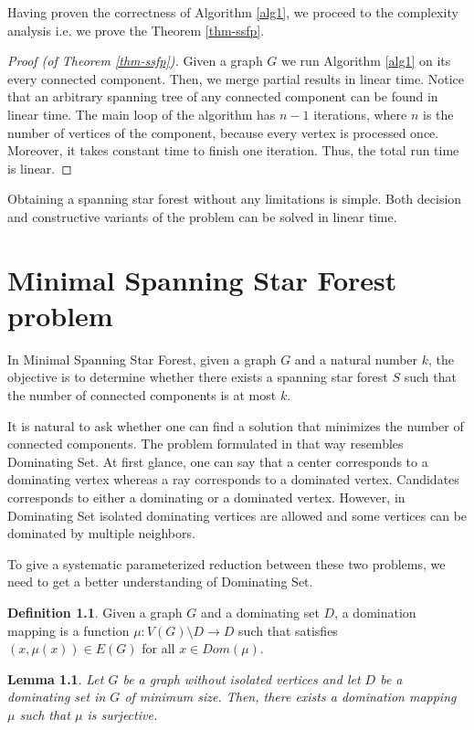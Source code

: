 \documentclass[en]{pracamgr}
\newtheorem{lemma}{Lemma}
\theoremstyle{definition}
\newtheorem{definition}{Definition}
\newcommand{\ssf}{spanning star forest}
\newcommand{\mssfp}{{\sc Minimal Spanning Star Forest}}
\newcommand{\domsetp}{{\sc Dominating Set}}
\begin{document}
Having proven the correctness of Algorithm \ref{alg1}, we proceed to the complexity analysis i.e. we prove the Theorem \ref{thm-ssfp}.

\begin{proof}[Proof (of Theorem \ref{thm-ssfp})]
	Given a graph $G$ we run Algorithm \ref{alg1} on its every connected component. Then, we  merge partial results in linear time. Notice that an arbitrary spanning tree of any connected component can be found in linear time. The main loop of the algorithm has $n-1$ iterations, where $n$ is the number of vertices of the component, because every vertex is processed once. Moreover, it takes constant time to finish one iteration. Thus, the total run time is linear.
\end{proof}

Obtaining a \ssf{} without any limitations is simple. Both decision and constructive variants of the problem can be solved in linear time.

\chapter{Minimal Spanning Star Forest problem}\label{sec4}

In \mssfp{}, given a graph $G$ and a natural number $k$, the objective is to determine whether there exists a \ssf{} $S$ such that the number of connected components is at most $k$.

It is natural to ask whether one can find a solution that minimizes the number of connected components. The problem formulated in that way resembles \domsetp{}. At first glance, one can say that a center corresponds to a dominating vertex whereas a ray corresponds to a dominated vertex. Candidates corresponds to either a dominating or a dominated vertex. However, in \domsetp{} isolated dominating vertices are allowed and some vertices can be dominated by multiple neighbors. 

To give a systematic parameterized reduction between these two problems, we need to get a better understanding of \domsetp{}.

\begin{definition}
	Given a graph $G$ and a dominating set $D$, a {\normalfont domination mapping} is a function $\mu:V(G) \setminus D \rightarrow D$ such that satisfies $(x,\mu(x)) \in E(G)$ for all $x \in Dom(\mu)$.
\end{definition}

\begin{lemma}\label{dom mapping}
	Let $G$ be a graph without isolated vertices and let $D$ be a dominating set in $G$ of minimum size. Then, there exists a domination mapping $\mu$ such that $\mu$ is surjective.
\end{lemma}
\end{document}
